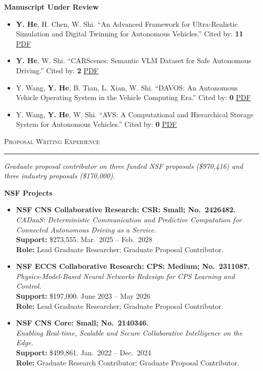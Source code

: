 \documentclass[11pt]{article}
\let\cvplainhref\href
\renewcommand{\href}[2]{\cvplainhref{#1}{\uline{#2}}}
\newcommand{\cvsection}[1]{%
  \Needspace{5\baselineskip}%
  \vspace{0.62em}%
  {\large\scshape #1}\par
  \vspace{0.12em}\hrule\vspace{0.32em}
}
\newcommand{\cvsubsection}[1]{%
  \Needspace{3\baselineskip}%
  \vspace{0.32em}%
  {\bfseries #1}\par
  \vspace{0.12em}
}
\newcommand{\cvsummary}[1]{%
  {\itshape #1}\par
  \vspace{0.18em}
}
\newcommand{\pubpdf}[1]{%
  \unskip\nobreakspace\href{#1}{PDF}%
}
\newcommand{\pubcitation}[1]{%
  \unskip\nobreakspace Cited by: \textbf{#1}%
}
\begin{document}
\cvsubsection{Manuscript Under Review}
\begin{itemize}
    \item \textbf{Y. He}, H. Chen, W. Shi. ``An Advanced Framework for Ultra-Realistic Simulation and Digital Twinning for Autonomous Vehicles.''
    \pubcitation{11}\pubpdf{https://arxiv.org/pdf/2405.01328}
    \item \textbf{Y. He}, W. Shi. ``CARScenes: Semantic VLM Dataset for Safe Autonomous Driving.''
    \pubcitation{2}\pubpdf{https://arxiv.org/pdf/2511.10701}
    \item Y. Wang, \textbf{Y. He}, B. Tian, L. Xian, W. Shi. ``DAVOS: An Autonomous Vehicle Operating System in the Vehicle Computing Era.''
    \pubcitation{0}\pubpdf{https://arxiv.org/pdf/2601.05072}
    \item Y. Wang, \textbf{Y. He}, W. Shi. ``AVS: A Computational and Hierarchical Storage System for Autonomous Vehicles.''
    \pubcitation{0}\pubpdf{https://arxiv.org/pdf/2511.19453}
\end{itemize}

\cvsection{Proposal Writing Experience}
\cvsummary{Graduate proposal contributor on three funded NSF proposals (\$970{,}416) and three
industry proposals (\$170{,}000).}

\cvsubsection{NSF Projects}
\begin{itemize}
    \item \textbf{NSF CNS Collaborative Research: CSR: Small; No.\ 2426482.}\\
    {\small\itshape CADaaS: Deterministic Communication and Predictive Computation for Connected Autonomous Driving as a Service.}\\
    \textbf{Support:} \$273{,}555. \hfill Mar.\ 2025 -- Feb.\ 2028\\
    \textbf{Role:} Lead Graduate Researcher; Graduate Proposal Contributor.\\
    \item \textbf{NSF ECCS Collaborative Research: CPS: Medium; No.\ 2311087.}\\
    {\small\itshape Physics-Model-Based Neural Networks Redesign for CPS Learning and Control.}\\
    \textbf{Support:} \$197{,}000. \hfill June 2023 -- May 2026\\
    \textbf{Role:} Lead Graduate Researcher; Graduate Proposal Contributor.\\
    \item \textbf{NSF CNS Core: Small; No.\ 2140346.}\\
    {\small\itshape Enabling Real-time, Scalable and Secure Collaborative Intelligence on the Edge.}\\
    \textbf{Support:} \$499{,}861. \hfill Jan.\ 2022 -- Dec.\ 2024\\
    \textbf{Role:} Graduate Research Contributor; Graduate Proposal Contributor.\\
\end{itemize}
\end{document}
